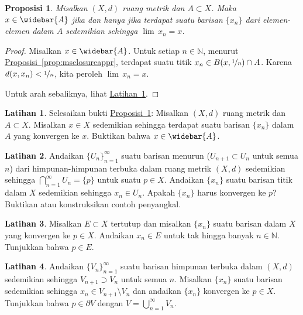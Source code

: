 \documentclass[12pt,openany]{book}
\newcommand{\N}{{\mathbb{N}}}
\theoremstyle{plain}
\newtheorem{prop}[thm]{Proposisi}
\theoremstyle{remark}
\theoremstyle{definition}
\newenvironment{exbox}{%
    \def\FrameCommand{\vrule width 1pt \relax\hspace{10pt}}%
    \MakeFramed{\advance\hsize-\width\FrameRestore}%
}{%
    \endMakeFramed
}
\theoremstyle{exercise}
\newtheorem{exercise}{Latihan}[section]
\theoremstyle{example}
\newcommand{\exerciseref}[1]{\hyperref[#1]{Latihan~\ref*{#1}}}
\newcommand{\propref}[1]{\hyperref[#1]{Proposisi~\ref*{#1}}}
\begin{document}
\begin{prop} \label{prop:msclosureapprseq}
Misalkan $(X,d)$ ruang metrik dan $A \subset X$.
Maka $x \in \widebar{A}$ jika dan hanya jika terdapat suatu barisan $\{ x_n \}$ dari
elemen-elemen dalam $A$ sedemikian sehingga $\lim\, x_n = x$.
\end{prop}

\begin{proof}
Misalkan $x \in \widebar{A}$. Untuk setiap $n \in \N$,
menurut
\propref{prop:msclosureappr}, terdapat
suatu titik $x_n \in B(x,\nicefrac{1}{n}) \cap A$.
Karena $d(x,x_n) < \nicefrac{1}{n}$, kita peroleh $\lim\, x_n = x$.

Untuk arah sebaliknya, lihat \exerciseref{exercise:reverseclosedseq}.
\end{proof}

\begin{exbox}
\begin{exercise}%
\label{exercise:reverseclosedseq}
Selesaikan bukti
\propref{prop:msclosureapprseq}:
Misalkan $(X,d)$ ruang metrik dan
$A \subset X$. Misalkan $x \in X$
sedemikian sehingga terdapat suatu barisan $\{ x_n \}$ dalam $A$ yang konvergen ke $x$.
Buktikan bahwa $x \in \widebar{A}$.
\end{exercise}

\begin{exercise}
Andaikan $\{ U_n \}_{n=1}^\infty$ suatu barisan menurun ($U_{n+1} \subset U_n$ untuk
semua $n$) dari himpunan-himpunan terbuka dalam ruang metrik $(X,d)$ sedemikian sehingga
$\bigcap_{n=1}^\infty U_n = \{ p \}$ untuk suatu $p \in X$. Andaikan
$\{ x_n \}$ suatu barisan titik dalam $X$ sedemikian sehingga $x_n \in U_n$. Apakah
$\{ x_n \}$ harus konvergen ke $p$? Buktikan atau konstruksikan contoh penyangkal.
\end{exercise}

\begin{exercise}
Misalkan $E \subset X$ tertutup dan
misalkan $\{ x_n \}$ suatu barisan dalam $X$ yang konvergen ke $p \in X$. Andaikan
$x_n \in E$ untuk tak hingga banyak $n \in \N$. Tunjukkan bahwa $p \in E$.
\end{exercise}

\begin{exercise}
Andaikan $\{ V_n \}_{n=1}^\infty$ suatu barisan himpunan terbuka
dalam $(X,d)$
sedemikian sehingga $V_{n+1} \supset V_n$ untuk semua $n$. Misalkan $\{ x_n \}$ suatu barisan
sedemikian sehingga $x_n \in V_{n+1} \setminus V_n$ dan andaikan
$\{ x_n \}$ konvergen ke $p \in X$. Tunjukkan bahwa $p \in \partial V$
dengan $V = \bigcup_{n=1}^\infty V_n$.
\end{exercise}
\end{exbox}
\end{document}
